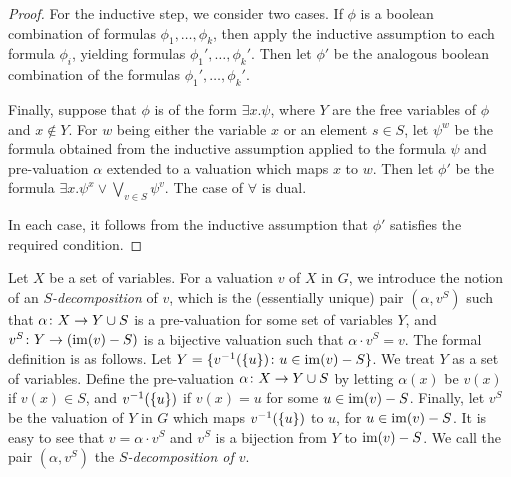 \begin{proof}
For the inductive step, we consider two cases.
If $\phi$ is a boolean combination of formulas $\phi_1,\ldots,\phi_k$, then 
apply the inductive assumption to each formula $\phi_i$,
yielding formulas $\phi_1',\ldots,\phi_k'$. Then let $\phi'$ be the analogous boolean combination of the formulas $\phi_1',\ldots,\phi_k'$.

Finally, suppose that $\phi$ is of the form $\exists x.\psi$, where   $Y$ are the free variables of $\phi$ and $x\not \in Y$.
 For $w$ being either the variable $x$ 
or an element $s\in S$, 
let $\psi^w$ be the formula obtained from the inductive assumption applied to the formula $\psi$ 
and pre-valuation $\alpha$ extended to a valuation which maps  $x$ to $w$. 
Then let $\phi'$
be the formula $\exists x.\psi^x \lor \bigvee_{v\in S}\psi^v$.
The case of $\forall$ is dual.

In each case, it follows from the inductive assumption that $\phi'$ 
satisfies the required condition.
\end{proof}



Let $X$ be a set of variables.
For a valuation  $v$ of $X$ in $G$, we introduce the notion of an \emph{$S$-decomposition} of $v$,  
which is the (essentially unique) pair $(\alpha,v^S)$
such that $\alpha\colon X\to Y\cup S$ is a pre-valuation
for some set of variables $Y$,
and $v^S\colon Y\to (\mathrm{im}(v)-S)$ is a bijective valuation such that 
$\alpha\cdot v^S=v$. The formal definition is as follows.
Let $Y=\{v^{-1}(\{u\})\colon u\in \mathrm{im}(v)-S\}$. We treat $Y$ as a set of variables. 
Define the pre-valuation $\alpha\colon X\to Y\cup S$
by letting $\alpha(x)$ be $v(x)$ if $v(x)\in S$,
and $v^{-1}(\{u\})$ if $v(x)=u$ for some $u\in \mathrm{im}(v)-S$.
Finally, let $v^S$ be the valuation of $Y$ in $G$ which
maps  $v^{-1}(\{u\})$ to $u$, for $u\in \mathrm{im}(v)-S$.
It is easy to see that $v=\alpha\cdot v^S$ and $v^S$ is a bijection from $Y$ 
to $\mathrm{im}(v)-S$. We call the pair $(\alpha,v^S)$ the \emph{$S$-decomposition of $v$}.



